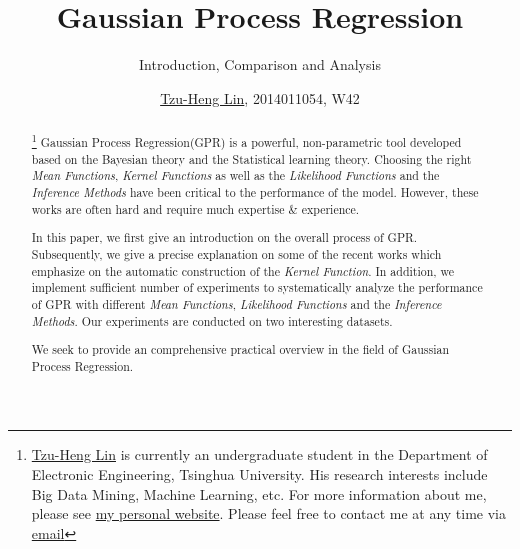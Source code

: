 \documentclass{sig-alternate-05-2015}
\begin{document}
\captionsetup[subfigure]{labelformat=empty}

\title{Gaussian Process Regression}
\subtitle{Introduction, Comparison and Analysis}
\author{
    \alignauthor \color{blue}\href{http://lzhbrian.me}{Tzu-Heng Lin}\color{black}, 2014011054, W42\\
}


\maketitle
\begin{abstract}
\footnote{\color{blue}\href{http://lzhbrian.me}{Tzu-Heng Lin} \color{black} is currently an undergraduate student in the Department of Electronic Engineering, Tsinghua University. His research interests include Big Data Mining, Machine Learning, etc. For more information about me, please see \color{blue}\href{http://lzhbrian.me}{my personal website}\color{black}.
Please feel free to contact me at any time via \color{blue}\href{mailto:lzhbrian@gmail.com}{email} }
Gaussian Process Regression(GPR) is a powerful, non-parametric tool developed based on the Bayesian theory and the Statistical learning theory. Choosing the right \emph{Mean Functions}, \emph{Kernel Functions} as well as the \emph{Likelihood Functions} and the \emph{Inference Methods} have been critical to the performance of the model. However, these works are often hard and require much expertise \& experience.

In this paper, we first give an introduction on the overall process of GPR. 
Subsequently, we give a precise explanation on some of the recent works which emphasize on the automatic construction of the \emph{Kernel Function}.
In addition, we implement sufficient number of experiments to systematically analyze the performance of GPR with different \emph{Mean Functions}, \emph{Likelihood Functions} and the \emph{Inference Methods}. Our experiments are conducted on two interesting datasets. 

We seek to provide an comprehensive practical overview in the field of Gaussian Process Regression.

\end{abstract}




%
%
\printccsdesc
\end{document}
